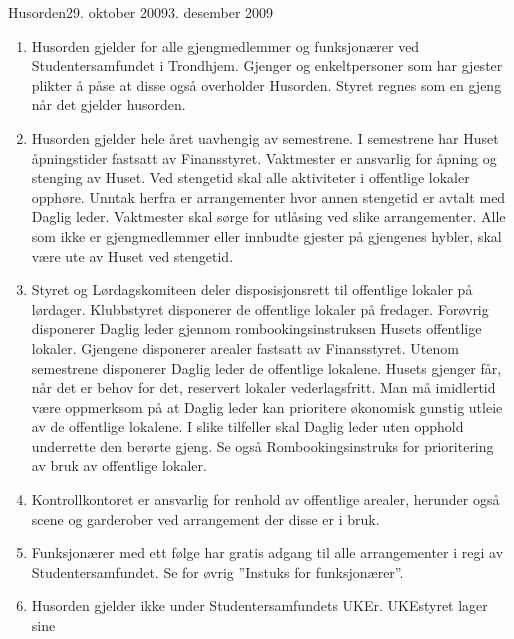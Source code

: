 \begin{instruks}{Husorden}{29. oktober 2009}{3. desember 2009}
    \begin{enumerate}
        \item Husorden gjelder for alle gjengmedlemmer og funksjonærer ved
            Studentersamfundet i Trondhjem.
            Gjenger og enkeltpersoner som har gjester plikter å påse at disse også
            overholder Husorden. Styret regnes
            som en gjeng når det gjelder husorden.
        \item Husorden gjelder hele året uavhengig av semestrene. I semestrene har Huset
            åpningstider fastsatt av
            Finansstyret. Vaktmester er ansvarlig for åpning og stenging av Huset. Ved
            stengetid skal alle aktiviteter i
            offentlige lokaler opphøre. Unntak herfra er arrangementer hvor annen
            stengetid er avtalt med Daglig
            leder. Vaktmester skal sørge for utlåsing ved slike arrangementer. Alle som
            ikke er gjengmedlemmer eller
            innbudte gjester på gjengenes hybler, skal være ute av Huset ved stengetid.
        \item Styret og Lørdagskomiteen deler disposisjonsrett til offentlige lokaler på
            lørdager. Klubbstyret disponerer
            de offentlige lokaler på fredager. Forøvrig disponerer Daglig leder gjennom
            rombookingsinstruksen
            Husets offentlige lokaler. Gjengene disponerer arealer fastsatt av
            Finansstyret. Utenom semestrene
            disponerer Daglig leder de offentlige lokalene. Husets gjenger får, når det er
            behov for det, reservert
            lokaler vederlagsfritt. Man må imidlertid være oppmerksom på at Daglig leder
            kan prioritere økonomisk
            gunstig utleie av de offentlige lokalene. I slike tilfeller skal Daglig leder
            uten opphold underrette den
            berørte gjeng. Se også Rombookingsinstruks for prioritering av bruk av
            offentlige lokaler.
        \item Kontrollkontoret er ansvarlig for renhold av offentlige arealer, herunder også
            scene og garderober ved
            arrangement der disse er i bruk.
        \item Funksjonærer med ett følge har gratis adgang til alle arrangementer i regi av
            Studentersamfundet. Se for
            øvrig ”Instuks for funksjonærer”.
        \item Husorden gjelder ikke under Studentersamfundets UKEr. UKEstyret lager sine

\end{enumerate}
\end{instruks}

